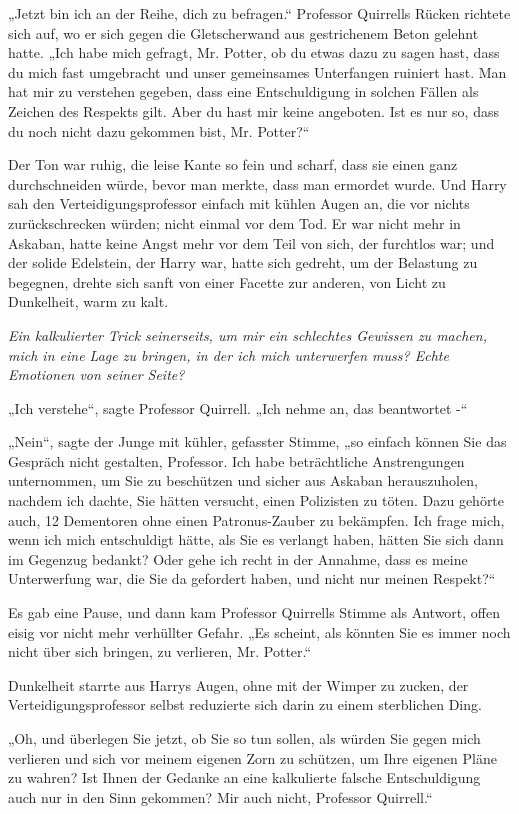 {„Jetzt bin ich an der Reihe, dich zu befragen.“ Professor Quirrells Rücken richtete sich auf, wo er sich gegen die Gletscherwand aus gestrichenem Beton gelehnt hatte. „Ich habe mich gefragt, Mr. Potter, ob du etwas dazu zu sagen hast, dass du mich fast umgebracht und unser gemeinsames Unterfangen ruiniert hast. Man hat mir zu verstehen gegeben, dass eine Entschuldigung in solchen Fällen als Zeichen des Respekts gilt. Aber du hast mir keine angeboten. Ist es nur so, dass du noch nicht dazu gekommen bist, Mr. Potter?“

Der Ton war ruhig, die leise Kante so fein und scharf, dass sie einen ganz durchschneiden würde, bevor man merkte, dass man ermordet wurde. Und Harry sah den Verteidigungsprofessor einfach mit kühlen Augen an, die vor nichts zurückschrecken würden; nicht einmal vor dem Tod. Er war nicht mehr in Askaban, hatte keine Angst mehr vor dem Teil von sich, der furchtlos war; und der solide Edelstein, der Harry war, hatte sich gedreht, um der Belastung zu begegnen, drehte sich sanft von einer Facette zur anderen, von Licht zu Dunkelheit, warm zu kalt.

\emph{Ein kalkulierter Trick seinerseits, um mir ein schlechtes Gewissen zu machen, mich in eine Lage zu bringen, in der ich mich unterwerfen muss? Echte Emotionen von seiner Seite?}

„Ich verstehe“, sagte Professor Quirrell. „Ich nehme an, das beantwortet -“

„Nein“, sagte der Junge mit kühler, gefasster Stimme, „so einfach können Sie das Gespräch nicht gestalten, Professor. Ich habe beträchtliche Anstrengungen unternommen, um Sie zu beschützen und sicher aus Askaban herauszuholen, nachdem ich dachte, Sie hätten versucht, einen Polizisten zu töten. Dazu gehörte auch, 12 Dementoren ohne einen Patronus-Zauber zu bekämpfen. Ich frage mich, wenn ich mich entschuldigt hätte, als Sie es verlangt haben, hätten Sie sich dann im Gegenzug bedankt? Oder gehe ich recht in der Annahme, dass es meine Unterwerfung war, die Sie da gefordert haben, und nicht nur meinen Respekt?“

Es gab eine Pause, und dann kam Professor Quirrells Stimme als Antwort, offen eisig vor nicht mehr verhüllter Gefahr. „Es scheint, als könnten Sie es immer noch nicht über sich bringen, zu verlieren, Mr. Potter.“

Dunkelheit starrte aus Harrys Augen, ohne mit der Wimper zu zucken, der Verteidigungsprofessor selbst reduzierte sich darin zu einem sterblichen Ding.

„Oh, und überlegen Sie jetzt, ob Sie so tun sollen, als würden Sie gegen mich verlieren und sich vor meinem eigenen Zorn zu schützen, um Ihre eigenen Pläne zu wahren? Ist Ihnen der Gedanke an eine kalkulierte falsche Entschuldigung auch nur in den Sinn gekommen? Mir auch nicht, Professor Quirrell.“

}
